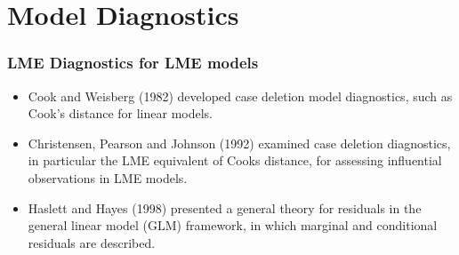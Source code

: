 \section{Model Diagnostics}
\begin{frame}\frametitle{LME Diagnostics for LME models}

\begin{itemize}
\item Cook and Weisberg (1982) developed case deletion model diagnostics, such as Cook's distance for linear models.
\item Christensen, Pearson and Johnson (1992) examined case deletion diagnostics, in particular the LME equivalent
of Cooks distance, for assessing influential observations in LME models.

\item Haslett and Hayes (1998) presented a general theory for residuals in the general linear model (GLM) framework, in which marginal and conditional residuals are described.
    
\end{itemize}



\end{frame}


